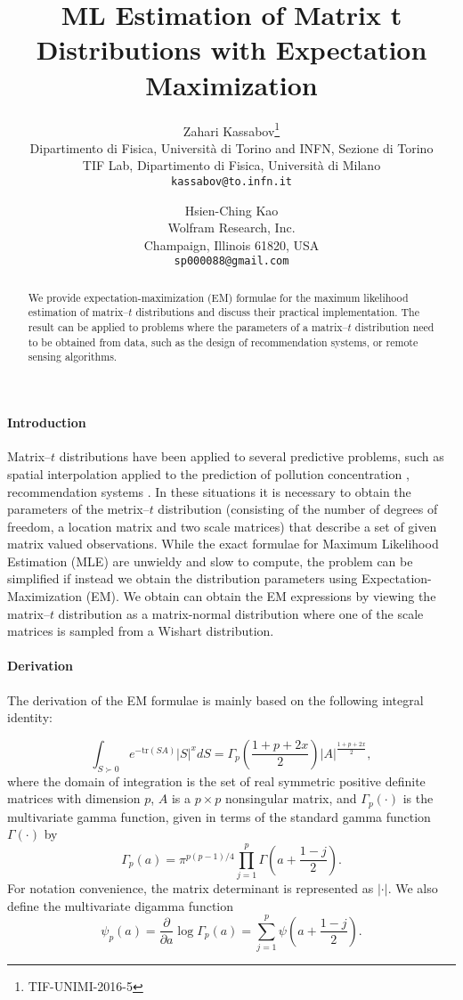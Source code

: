 \documentclass[english,listof=totoc]{scrartcl}
\title{ML Estimation of Matrix t Distributions with Expectation Maximization}
\author{Zahari Kassabov\thanks{TIF-UNIMI-2016-5}\\
        Dipartimento di Fisica, Universit\`a di Torino and INFN, Sezione di Torino\\
		TIF Lab, Dipartimento di Fisica, Universit\`a di Milano\\
        \texttt{kassabov@to.infn.it}\\
        \and
        Hsien-Ching Kao\\
        Wolfram Research, Inc.\\
		Champaign, Illinois 61820, USA\\
		\texttt{sp000088@gmail.com}
		}
\begin{document}
\maketitle

\begin{abstract}
We provide expectation-maximization (EM) formulae for the maximum
likelihood estimation of matrix--$t$ distributions and discuss their
practical implementation.  The result can be applied to problems where
the parameters of a matrix--$t$ distribution need to be obtained from
data, such as the design of recommendation systems, or remote sensing
algorithms.
\end{abstract}

\paragraph{Introduction}
Matrix--$t$ distributions have been applied to several predictive
problems, such as spatial interpolation applied to the prediction of
pollution concentration \citep{KIBRIA2006785}, recommendation systems
\citep{NIPS2007_3203}. In these situations it is necessary to obtain
the parameters of the metrix--$t$ distribution (consisting of the
number of degrees of freedom, a location matrix and two scale
matrices) that describe a set of given matrix valued observations.
While the exact formulae for Maximum Likelihood Estimation (MLE) are
unwieldy and slow to compute, the problem can be simplified if instead
we obtain the distribution parameters using Expectation-Maximization
(EM). We obtain can obtain the EM expressions by viewing the
matrix--$t$  distribution as a matrix-normal distribution where one of
the scale matrices is sampled from a Wishart distribution.

\paragraph{Derivation}

The derivation of the EM formulae is mainly based on the following
integral identity:

\begin{equation}
\int_{S\succ 0}e^{-\textrm{tr}(SA)}|S|^{x}dS=\Gamma_{p}\left(\frac{1+p+2x}{2}\right)|A|^{\frac{1+p+2x}{2}},\label{eq:intmultgammadef}
\end{equation}
where the domain of integration is the set of real symmetric
positive definite matrices with dimension $p$, $A$ is a $p\times p$
nonsingular matrix, and $\Gamma_{p}(\cdot)$ is the multivariate gamma
function, given in terms of the standard gamma function $\Gamma(\cdot)$
by
\begin{equation}
\Gamma_{p}(a)=\pi^{p(p-1)/4}\prod_{j=1}^{p}\Gamma\left(a+\frac{1-j}{2}\right).\label{eq:multgammadef}
\end{equation}
For notation convenience, the matrix determinant is represented as
$|\cdot|$. We also define the multivariate digamma function
%
\begin{equation} \psi_{p}(a)=\frac{\partial}{\partial
	a}\log\Gamma_{p}(a)=\sum_{j=1}^{p}\psi\left(a+\frac{1-j}{2}\right).
\end{equation}
\end{document}
